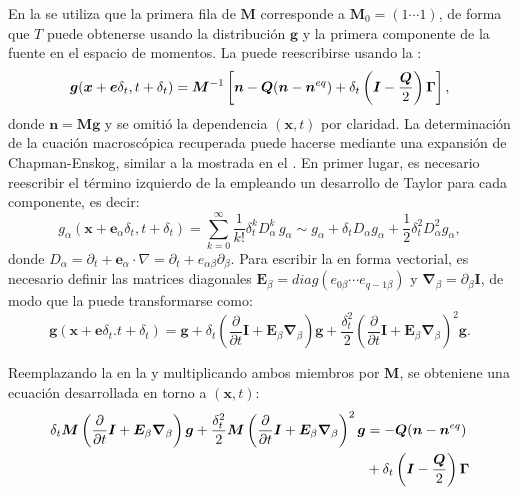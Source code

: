En la  se utiliza que la primera fila de $\bm{M}$ corresponde a $\bm{M}_0 = (1 \cdots 1)$, de forma que $T$ puede obtenerse usando la distribuci\'on $\bm{g}$ y la primera componente de la fuente en el espacio de momentos. La  puede reescribirse usando la :
\begin{equation}
	\bm{g}(\bm{x} + \bm{e} \delta_t, t+\delta_t) = \bm{M}^{-1} \left[ \bm{n} - \bm{Q}(\bm{n} - \bm{n}^{eq}) + \delta_t \left( \bm{I}-\dfrac{\bm{Q}}{2}\right) \bm{\Gamma}\right],
	\label{eq:g_model_2d}
\end{equation}
donde $\bm{n} = \bm{Mg}$ y se omiti\'o la dependencia $(\bm{x},t)$ por claridad. La determinaci\'on de la cuaci\'on macrosc\'opica  recuperada puede hacerse mediante una expansi\'on de Chapman-Enskog, similar a la mostrada en el . En primer lugar, es necesario reescribir el t\'ermino izquierdo de la  empleando un desarrollo de Taylor para cada componente, es decir:
\begin{equation}
	g_{\alpha}(\bm{x}+\bm{e}_{\alpha}\delta_t,t+\delta_t) = \sum_{k=0}^{\infty} \dfrac{1}{k!}\delta_t^k D_{\alpha}^{k} \, g_{\alpha} \sim g_{\alpha} + \delta_t D_{\alpha} g_{\alpha} + \dfrac{1}{2}\delta_t^2 D_{\alpha}^2g_{\alpha},
	\label{eq:taylor_gral}
\end{equation}
donde $D_{\alpha} = \partial_t + \bm{e}_{\alpha} \cdot \nabla=\partial_t + e_{\alpha \beta} \partial_{\beta}$. Para escribir la  en forma vectorial, es necesario definir las matrices diagonales $\bm{E}_{\beta} = diag(e_{0\beta} \cdots e_{q-1\beta})$ y $\bm{\nabla}_{\beta} = \partial_{\beta} \bm{I}$, de modo que la  puede transformarse como:
\begin{equation}
	\bm{g}(\bm{x}+\bm{e}\delta_t. t+\delta_t) = \bm{g} 
	+ \delta_t\left( \dfrac{\partial}{\partial t} \bm{I} + \bm{E}_{\beta}\bm{\nabla}_{\beta} \right) \bm{g}
	+ \dfrac{\delta^2_t}{2} \left( \dfrac{\partial}{\partial t} \bm{I} + \bm{E}_{\beta}\bm{\nabla}_{\beta} \right)^2 \bm{g}.
	\label{eq:taylor_vec}
\end{equation}

Reemplazando la  en la  y multiplicando ambos miembros por $\bm{M}$, se obteniene una ecuaci\'on desarrollada en torno a $(\bm{x},t)$:
\begin{equation}
	\begin{aligned}
	\delta_t \bm{M}\left( \dfrac{\partial}{\partial t} \bm{I} + \bm{E}_{\beta}\bm{\nabla}_{\beta} \right) \bm{g} + \dfrac{\delta^2_t}{2} \bm{M}\left( \dfrac{\partial}{\partial t} \bm{I} + \bm{E}_{\beta}\bm{\nabla}_{\beta} \right)^2 \bm{g} 
	&= -\bm{Q}(\bm{n} - \bm{n}^{eq}) \\
	& + \delta_t \left( \bm{I}-\dfrac{\bm{Q}}{2}\right) \bm{\Gamma}
	\end{aligned}
	\label{eq:taylor_vec_2}
\end{equation}

